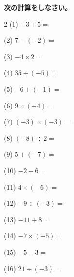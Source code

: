 \documentclass[a4paper, 11pt]{ltjsarticle}
\begin{document}


\noindent \textbf{次の計算をしなさい。}

\begin{multicols*}{2}
\noindent (1) \quad $-3+5 =$ \vspace*{\fill}

\noindent (2) \quad $7-(-2) =$ \vspace*{\fill}

\noindent (3) \quad $-4\times2 =$ \vspace*{\fill}

\noindent (4) \quad $35\div(-5) =$ \vspace*{\fill}

\noindent (5) \quad $-6+(-1) =$ \vspace*{\fill}

\noindent (6) \quad $9\times(-4) =$ \vspace*{\fill}

\noindent (7) \quad $(-3)\times(-3) =$ \vspace*{\fill}

\noindent (8) \quad $(-8)\div2 =$ \vspace*{\fill}

\noindent (9) \quad $5+(-7) =$ \vspace*{\fill}

\noindent (10) \quad $-2-6 =$ \vspace*{\fill}

\noindent (11) \quad $4\times(-6) =$ \vspace*{\fill}

\noindent (12) \quad $-9\div(-3) =$ \vspace*{\fill}

\noindent (13) \quad $-11+8 =$ \vspace*{\fill}

\noindent (14) \quad $-7\times(-5) =$ \vspace*{\fill}

\noindent (15) \quad $-5-3 =$ \vspace*{\fill}

\columnbreak
\noindent (16) \quad $21\div(-3) =$ \vspace*{\fill}


\end{multicols*}
\end{document}
